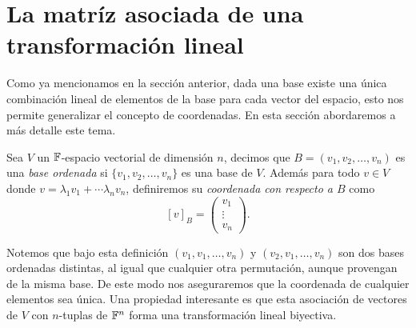 \section{La matríz asociada de una transformación lineal}

Como ya mencionamos en la sección anterior, dada una base existe una única combinación lineal de elementos de la base para cada vector del espacio, esto nos permite generalizar el concepto de coordenadas. En esta sección abordaremos a más detalle este tema.


\begin{defi}
  Sea $V$ un $\mathbb{F}$-espacio vectorial de dimensión $n$, decimos que $B = (v_1, v_2, \ldots, v_n)$ es una \emph{base ordenada} si $\{v_1, v_2, \ldots, v_n\}$ es una base de $V$. Además para todo $v \in V$ donde $v = \lambda_1 v_1 + \cdots \lambda_n v_n$, definiremos su \emph{coordenada con respecto a $B$} como
    \[ [v]_B = \begin{pmatrix}
      v_1 \\ \vdots \\ v_n
    \end{pmatrix}.\]
\end{defi}

Notemos que bajo esta definición $(v_1, v_1, \ldots, v_n)$ y $(v_2, v_1, \ldots, v_n)$ son dos bases ordenadas distintas, al igual que cualquier otra permutación, aunque provengan de la misma base. De este modo nos aseguraremos que la coordenada de cualquier elementos sea única. Una propiedad interesante es que esta asociación de vectores de $V$ con $n$-tuplas de $\mathbb{F}^n$ forma una transformación lineal biyectiva.

